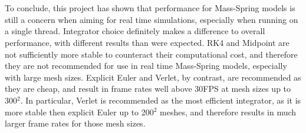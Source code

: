 \\\\To conclude, this project has shown that performance for Mass-Spring models is still a concern when aiming for real time simulations, especially when running on a single thread. Integrator choice definitely makes a difference to overall performance, with different results than were expected. RK4 and Midpoint are not sufficiently more stable to counteract their computational cost, and therefore they are not recommended for use in real time Mass-Spring models, especially with large mesh sizes. Explicit Euler and Verlet, by contrast, are recommended as they are cheap, and result in frame rates well above 30FPS at mesh sizes up to 300$^{2}$. In particular, Verlet is recommended as the most efficient integrator, as it is more stable then explicit Euler up to 200$^{2}$ meshes, and therefore results in much larger frame rates for those mesh sizes.

